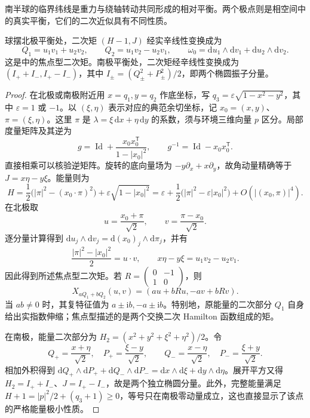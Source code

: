 南半球的临界纬线是重力与绕轴转动共同形成的相对平衡。两个极点则是相空间中的真实平衡，它们的二次近似具有不同性质。

\begin{proposition}\label{g4:prop:1104:pendulum-linear-types}
	球摆北极平衡处，二次矩 \((H-1,J)\) 经实辛线性变换成为
	\begin{equation}\label{g4:eq:1104:pendulum-focus-pair}
		Q_1=u_1v_1+u_2v_2,
		\qquad Q_2=u_1v_2-u_2v_1,
		\qquad \omega_0=\mathrm{d}u_1\wedge\mathrm{d}v_1+\mathrm{d}u_2\wedge\mathrm{d}v_2.
	\end{equation}
	这是中的焦点型二次矩。南极平衡处，二次矩经辛线性变换成为 \((I_++I_-,I_+-I_-)\)，其中 \(I_\pm=(Q_\pm^2+P_\pm^2)/2\)，即两个椭圆振子分量。
\end{proposition}
\begin{proof}
	在北极或南极附近用 \(x=q_1,y=q_2\) 作底坐标，写 \(q_3=\varepsilon\sqrt{1-x^2-y^2}\)，其中 \(\varepsilon=1\) 或 \(-1\)。以 \((\xi,\eta)\) 表示对应的典范余切坐标，记 \(x_0=(x,y)\)、\(\pi=(\xi,\eta)\)。这里 \(\pi\) 是 \(\lambda=\xi\,\mathrm{d}x+\eta\,\mathrm{d}y\) 的系数，须与环境三维向量 \(p\) 区分。局部度量矩阵及其逆为
	\[
		g=\operatorname{Id}+\frac{x_0x_0^{\mathsf T}}{1-|x_0|^2},
		\qquad g^{-1}=\operatorname{Id}-x_0x_0^{\mathsf T}.
	\]
	直接相乘可以核验逆矩阵。旋转的底向量场为 \(-y\partial_x+x\partial_y\)，故角动量精确等于 \(J=x\eta-y\xi\)。能量则为
	\[
		H=\frac12\bigl(|\pi|^2-(x_0\cdot\pi)^2\bigr)
		+\varepsilon\sqrt{1-|x_0|^2}
		=\varepsilon+\frac12\bigl(|\pi|^2-\varepsilon|x_0|^2\bigr)+O(|(x_0,\pi)|^4).
	\]
	在北极取
	\[
		u=\frac{x_0+\pi}{\sqrt2},\qquad
		v=\frac{\pi-x_0}{\sqrt2}.
	\]
	逐分量计算得到 \(\mathrm{d}u_j\wedge\mathrm{d}v_j=\mathrm{d}(x_0)_j\wedge\mathrm{d}\pi_j\)，并有
	\[
		\frac{|\pi|^2-|x_0|^2}{2}=u\cdot v,
		\qquad x\eta-y\xi=u_1v_2-u_2v_1.
	\]
	因此得到所述焦点型二次矩。若 \(R=\left(\begin{smallmatrix}0&-1\\1&0\end{smallmatrix}\right)\)，则
	\[
		X_{aQ_1+bQ_2}(u,v)=(au+bRu,-av+bRv).
	\]
	当 \(ab\ne0\) 时，其复特征值为 \(a\pm\mathrm{i}b,-a\pm\mathrm{i}b\)。特别地，原能量的二次部分 \(Q_1\) 自身给出实指数伸缩；焦点型描述的是两个交换二次 Hamilton 函数组成的矩。

	在南极，能量二次部分为 \(H_2=(x^2+y^2+\xi^2+\eta^2)/2\)。令
	\[
		Q_+=\frac{x+\eta}{\sqrt2},\quad
		P_+=\frac{\xi-y}{\sqrt2},\qquad
		Q_-=\frac{x-\eta}{\sqrt2},\quad
		P_-=\frac{\xi+y}{\sqrt2}.
	\]
	相加外积得到 \(\mathrm{d}Q_+\wedge\mathrm{d}P_++\mathrm{d}Q_-\wedge\mathrm{d}P_-=\mathrm{d}x\wedge\mathrm{d}\xi+\mathrm{d}y\wedge\mathrm{d}\eta\)。展开平方又得 \(H_2=I_++I_-\)、\(J=I_+-I_-\)，故是两个独立椭圆分量。此外，完整能量满足 \(H+1=|p|^2/2+(q_3+1)\ge0\)，等号只在南极零动量成立，这也直接显示了该点的严格能量极小性质。
\end{proof}

